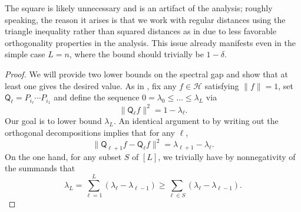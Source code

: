 \documentclass[11pt]{article}
\begin{document}
The square is likely unnecessary and is an artifact of the analysis; roughly speaking, the reason it arises is that we work with regular distances using the triangle inequality rather than squared distances as in  due to less favorable orthogonality properties in the analysis. This issue already manifests even in the simple case $L=n$, where the bound should trivially be $1-\delta$.
\begin{proof}
    We will provide two lower bounds on the spectral gap and show that at least one gives the desired value. As in , fix any $f\in \mathcal{H}$ satisfying $\|f\|=1$, set $\mathsf{Q}_{\ell} = P_{i_{\ell}}\cdots P_{i_1}$ and define the sequence $0=\lambda_0\leq \ldots\leq \lambda_L$ via
\begin{equation*}
    \|\mathsf{Q}_{{\ell}}f\|^2 = 1-\lambda_{\ell}.
\end{equation*}
Our goal is to lower bound $\lambda_L$. An identical argument to  by writing out the orthogonal decompositions implies that for any $\ell$,
\begin{equation}
\label{eq:telescope_2}
    \|\mathsf{Q}_{{\ell+1}}f - \mathsf{Q}_{{\ell}}f\|^2 = \lambda_{\ell+1} - \lambda_{\ell}.
\end{equation}
On the one hand, for any subset $S$ of $[L]$, we trivially have by nonnegativity of the summands that
\begin{equation}
\label{eq:bound_1}
    \lambda_L = \sum_{\ell=1}^L (\lambda_{\ell}-\lambda_{\ell-1})\geq \sum_{\ell\in S} (\lambda_{\ell}-\lambda_{\ell-1}).
\end{equation}


\end{proof}
\end{document}
